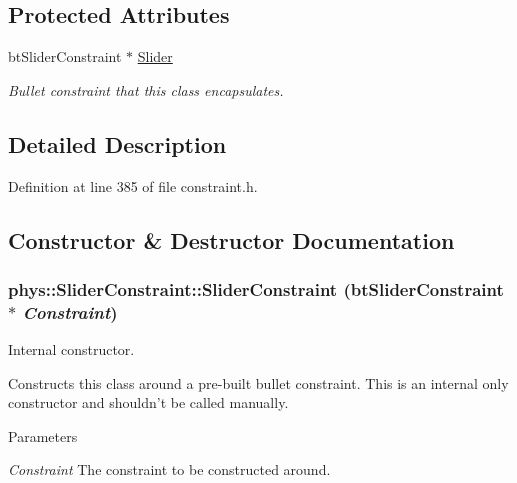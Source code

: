\subsection*{Protected Attributes}
\begin{DoxyCompactItemize}
\item 
\hypertarget{classphys_1_1SliderConstraint_ae99629f3e87f72d3271ff82137fa81e2}{
btSliderConstraint $\ast$ \hyperlink{classphys_1_1SliderConstraint_ae99629f3e87f72d3271ff82137fa81e2}{Slider}}
\label{dc/d72/classphys_1_1SliderConstraint_ae99629f3e87f72d3271ff82137fa81e2}

\begin{DoxyCompactList}\small\item\em Bullet constraint that this class encapsulates. \item\end{DoxyCompactList}\end{DoxyCompactItemize}


\subsection{Detailed Description}


Definition at line 385 of file constraint.h.



\subsection{Constructor \& Destructor Documentation}
\hypertarget{classphys_1_1SliderConstraint_a142708184f0a445edadddc4ad5ca08b5}{
\subsubsection[{SliderConstraint}]{\setlength{\rightskip}{0pt plus 5cm}phys::SliderConstraint::SliderConstraint (btSliderConstraint $\ast$ {\em Constraint})}}
\label{dc/d72/classphys_1_1SliderConstraint_a142708184f0a445edadddc4ad5ca08b5}


Internal constructor. 

Constructs this class around a pre-\/built bullet constraint. This is an internal only constructor and shouldn't be called manually. 
\begin{DoxyParams}{Parameters}
\item[{\em Constraint}]The constraint to be constructed around. \end{DoxyParams}


